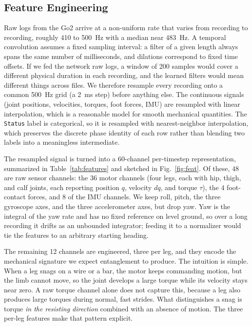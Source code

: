\subsection{Feature Engineering}
\label{sec:feat}

Raw logs from the Go2 arrive at a non-uniform rate that varies from recording to recording, roughly 410 to 500~Hz with a median near 483~Hz. A temporal convolution assumes a fixed sampling interval: a filter of a given length always spans the same number of milliseconds, and dilations correspond to fixed time offsets. If we fed the network raw logs, a window of 200 samples would cover a different physical duration in each recording, and the learned filters would mean different things across files. We therefore resample every recording onto a common 500~Hz grid (a 2~ms step) before anything else. The continuous signals (joint positions, velocities, torques, foot forces, IMU) are resampled with linear interpolation, which is a reasonable model for smooth mechanical quantities. The \texttt{Status} label is categorical, so it is resampled with nearest-neighbor interpolation, which preserves the discrete phase identity of each row rather than blending two labels into a meaningless intermediate.

The resampled signal is turned into a 60-channel per-timestep representation, summarized in Table~\ref{tab:features} and sketched in Fig.~\ref{fig:feat}. Of these, 48 are raw sensor channels: the 36 motor channels (four legs, each with hip, thigh, and calf joints, each reporting position $q$, velocity $dq$, and torque $\tau$), the 4 foot-contact forces, and 8 of the IMU channels. We keep roll, pitch, the three gyroscope axes, and the three accelerometer axes, but drop yaw. Yaw is the integral of the yaw rate and has no fixed reference on level ground, so over a long recording it drifts as an unbounded integrator; feeding it to a normalizer would tie the features to an arbitrary starting heading.

The remaining 12 channels are engineered, three per leg, and they encode the mechanical signature we expect entanglement to produce. The intuition is simple. When a leg snags on a wire or a bar, the motor keeps commanding motion, but the limb cannot move, so the joint develops a large torque while its velocity stays near zero. A raw torque channel alone does not capture this, because a leg also produces large torques during normal, fast strides. What distinguishes a snag is torque \emph{in the resisting direction} combined with an absence of motion. The three per-leg features make that pattern explicit.

